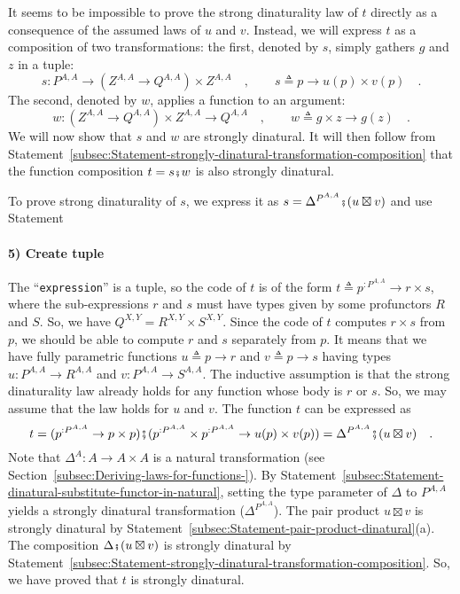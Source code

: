 It seems to be impossible to prove the strong dinaturality law of
$t$ directly as a consequence of the assumed laws of $u$ and $v$.
Instead, we will express $t$ as a composition of two transformations:
the first, denoted by $s$, simply gathers $g$ and $z$ in a tuple:
\[
s:P^{A,A}\rightarrow(Z^{A,A}\rightarrow Q^{A,A})\times Z^{A,A}\quad,\quad\quad s\triangleq p\rightarrow u(p)\times v(p)\quad.
\]
The second, denoted by $w$, applies a function to an argument:
\[
w:(Z^{A,A}\rightarrow Q^{A,A})\times Z^{A,A}\rightarrow Q^{A,A}\quad,\quad\quad w\triangleq g\times z\rightarrow g(z)\quad.
\]
We will now show that $s$ and $w$ are strongly dinatural. It will
then follow from Statement~\ref{subsec:Statement-strongly-dinatural-transformation-composition}
that the function composition $t=s\bef w$ is also strongly dinatural.

To prove strong dinaturality of $s$, we express it as $s=\Delta^{P^{A,A}}\bef(u\boxtimes v)$
and use Statement

\paragraph{5) Create tuple }

The \textsf{``}\lstinline!expression!\textsf{''} is a tuple, so the code of $t$
is of the form $t\triangleq p^{:P^{A,A}}\rightarrow r\times s$, where
the sub-expressions $r$ and $s$ must have types given by some profunctors
$R$ and $S$. So, we have $Q^{X,Y}=R^{X,Y}\times S^{X,Y}$. Since
the code of $t$ computes $r\times s$ from $p$, we should be able
to compute $r$ and $s$ separately from $p$. It means that we have
fully parametric functions $u\triangleq p\rightarrow r$ and $v\triangleq p\rightarrow s$
having types $u:P^{A,A}\rightarrow R^{A,A}$ and $v:P^{A,A}\rightarrow S^{A,A}$.
The inductive assumption is that the strong dinaturality law already
holds for any function whose body is $r$ or $s$. So, we may assume
that the law holds for $u$ and $v$. The function $t$ can be expressed
as
\[
t=(p^{:P^{A,A}}\rightarrow p\times p)\bef(p^{:P^{A,A}}\times p^{:P^{A,A}}\rightarrow u(p)\times v(p))=\Delta^{P^{A,A}}\bef(u\boxtimes v)\quad.
\]
Note that $\Delta^{A}:A\rightarrow A\times A$ is a natural transformation
(see Section~\ref{subsec:Deriving-laws-for-functions-}). By Statement~\ref{subsec:Statement-dinatural-substitute-functor-in-natural},
setting the type parameter of $\Delta$ to $P^{A,A}$ yields a strongly
dinatural transformation ($\Delta^{P^{A,A}}$). The pair product $u\boxtimes v$
is strongly dinatural by Statement~\ref{subsec:Statement-pair-product-dinatural}(a).
The composition $\Delta\bef(u\boxtimes v)$ is strongly dinatural
by Statement~\ref{subsec:Statement-strongly-dinatural-transformation-composition}.
So, we have proved that $t$ is strongly dinatural.

